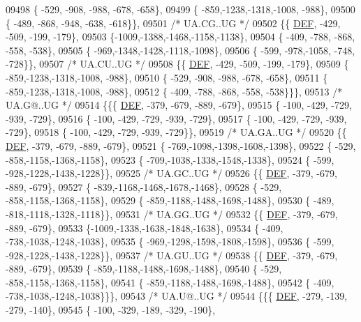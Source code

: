 \begin{DoxyCode}
09498 \{ -529, -908, -988, -678, -658\},
09499 \{ -859,-1238,-1318,-1008, -988\},
09500 \{ -489, -868, -948, -638, -618\}\},
09501 \textcolor{comment}{/* UA.CG..UG */}
09502 \{\{  \mbox{\hyperlink{1_88_84__epars_8h_a397419fc12b37ed479c8abb9d444d843}{DEF}}, -429, -509, -199, -179\},
09503 \{-1009,-1388,-1468,-1158,-1138\},
09504 \{ -409, -788, -868, -558, -538\},
09505 \{ -969,-1348,-1428,-1118,-1098\},
09506 \{ -599, -978,-1058, -748, -728\}\},
09507 \textcolor{comment}{/* UA.CU..UG */}
09508 \{\{  \mbox{\hyperlink{1_88_84__epars_8h_a397419fc12b37ed479c8abb9d444d843}{DEF}}, -429, -509, -199, -179\},
09509 \{ -859,-1238,-1318,-1008, -988\},
09510 \{ -529, -908, -988, -678, -658\},
09511 \{ -859,-1238,-1318,-1008, -988\},
09512 \{ -409, -788, -868, -558, -538\}\}\},
09513 \textcolor{comment}{/* UA.G@..UG */}
09514 \{\{\{  \mbox{\hyperlink{1_88_84__epars_8h_a397419fc12b37ed479c8abb9d444d843}{DEF}}, -379, -679, -889, -679\},
09515 \{ -100, -429, -729, -939, -729\},
09516 \{ -100, -429, -729, -939, -729\},
09517 \{ -100, -429, -729, -939, -729\},
09518 \{ -100, -429, -729, -939, -729\}\},
09519 \textcolor{comment}{/* UA.GA..UG */}
09520 \{\{  \mbox{\hyperlink{1_88_84__epars_8h_a397419fc12b37ed479c8abb9d444d843}{DEF}}, -379, -679, -889, -679\},
09521 \{ -769,-1098,-1398,-1608,-1398\},
09522 \{ -529, -858,-1158,-1368,-1158\},
09523 \{ -709,-1038,-1338,-1548,-1338\},
09524 \{ -599, -928,-1228,-1438,-1228\}\},
09525 \textcolor{comment}{/* UA.GC..UG */}
09526 \{\{  \mbox{\hyperlink{1_88_84__epars_8h_a397419fc12b37ed479c8abb9d444d843}{DEF}}, -379, -679, -889, -679\},
09527 \{ -839,-1168,-1468,-1678,-1468\},
09528 \{ -529, -858,-1158,-1368,-1158\},
09529 \{ -859,-1188,-1488,-1698,-1488\},
09530 \{ -489, -818,-1118,-1328,-1118\}\},
09531 \textcolor{comment}{/* UA.GG..UG */}
09532 \{\{  \mbox{\hyperlink{1_88_84__epars_8h_a397419fc12b37ed479c8abb9d444d843}{DEF}}, -379, -679, -889, -679\},
09533 \{-1009,-1338,-1638,-1848,-1638\},
09534 \{ -409, -738,-1038,-1248,-1038\},
09535 \{ -969,-1298,-1598,-1808,-1598\},
09536 \{ -599, -928,-1228,-1438,-1228\}\},
09537 \textcolor{comment}{/* UA.GU..UG */}
09538 \{\{  \mbox{\hyperlink{1_88_84__epars_8h_a397419fc12b37ed479c8abb9d444d843}{DEF}}, -379, -679, -889, -679\},
09539 \{ -859,-1188,-1488,-1698,-1488\},
09540 \{ -529, -858,-1158,-1368,-1158\},
09541 \{ -859,-1188,-1488,-1698,-1488\},
09542 \{ -409, -738,-1038,-1248,-1038\}\}\},
09543 \textcolor{comment}{/* UA.U@..UG */}
09544 \{\{\{  \mbox{\hyperlink{1_88_84__epars_8h_a397419fc12b37ed479c8abb9d444d843}{DEF}}, -279, -139, -279, -140\},
09545 \{ -100, -329, -189, -329, -190\},

\end{DoxyCode}
